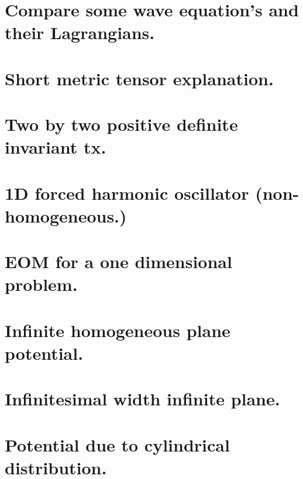 %
%

\renewcommand{\basename}{blah}
\renewcommand{\dirname}{notes/classicalmechanics/}



\usepackage{peeters_figures}
\usepackage{macros_cal}

\newcommand{\nbref}[1]{%
\itemRef{classicalmechanics}{#1}%
\index{Mathematica}%
}

\newcommand{\bookchapcite}[2]{\ref{chap:#1}}

\beginArtNoToc


\chapter{Compare some wave equation's and their Lagrangians.}
   
\chapter{Short metric tensor explanation.}
   
\chapter{Two by two positive definite invariant tx.}
    
\chapter{1D forced harmonic oscillator (non-homogeneous.)}
    
\chapter{EOM for a one dimensional problem.}
    
\chapter{Infinite homogeneous plane potential.}
   
\chapter{Infinitesimal width infinite plane.}
   
\chapter{Potential due to cylindrical distribution.}
   
\EndNoBibArticle
